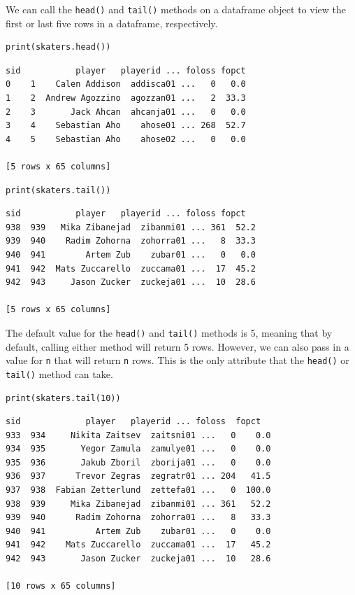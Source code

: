 We can call the \verb|head()| and \verb|tail()| methods on a dataframe object to view the first or last five rows in a dataframe, respectively.
\begin{lstlisting}[style=pippython]
print(skaters.head())
\end{lstlisting}
\begin{lstlisting}[style=none]
sid           player   playerid ... foloss fopct
0    1    Calen Addison  addisca01 ...   0   0.0
1    2  Andrew Agozzino  agozzan01 ...   2  33.3
2    3       Jack Ahcan  ahcanja01 ...   0   0.0
3    4    Sebastian Aho    ahose01 ... 268  52.7
4    5    Sebastian Aho    ahose02 ...   0   0.0

[5 rows x 65 columns]
\end{lstlisting}
\begin{lstlisting}[style=pippython]
print(skaters.tail())
\end{lstlisting}
\begin{lstlisting}[style=none]
sid           player   playerid ... foloss fopct
938  939   Mika Zibanejad  zibanmi01 ... 361  52.2
939  940    Radim Zohorna  zohorra01 ...   8  33.3
940  941        Artem Zub    zubar01 ...   0   0.0
941  942  Mats Zuccarello  zuccama01 ...  17  45.2
942  943     Jason Zucker  zuckeja01 ...  10  28.6

[5 rows x 65 columns]
\end{lstlisting}
The default value for the \verb|head()| and \verb|tail()| methods is 5, meaning that by default, calling either method will return 5 rows. However, we can also pass in a value for \verb|n| that will return \verb|n| rows. This is the only attribute that the \verb|head()| or \verb|tail()| method can take.\par
\begin{lstlisting}[style=pippython]
print(skaters.tail(10))
\end{lstlisting}
\begin{lstlisting}[style=none]
sid             player   playerid ... foloss  fopct
933  934     Nikita Zaitsev  zaitsni01 ...   0    0.0
934  935       Yegor Zamula  zamulye01 ...   0    0.0
935  936       Jakub Zboril  zborija01 ...   0    0.0
936  937      Trevor Zegras  zegratr01 ... 204   41.5
937  938  Fabian Zetterlund  zettefa01 ...   0  100.0
938  939     Mika Zibanejad  zibanmi01 ... 361   52.2
939  940      Radim Zohorna  zohorra01 ...   8   33.3
940  941          Artem Zub    zubar01 ...   0    0.0
941  942    Mats Zuccarello  zuccama01 ...  17   45.2
942  943       Jason Zucker  zuckeja01 ...  10   28.6

[10 rows x 65 columns]
\end{lstlisting}


